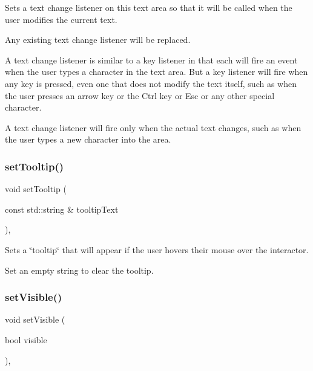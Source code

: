 Sets a text change listener on this text area so that it will be called when the user modifies the current text. 

Any existing text change listener will be replaced.

A text change listener is similar to a key listener in that each will fire an event when the user types a character in the text area. But a key listener will fire when any key is pressed, even one that does not modify the text itself, such as when the user presses an arrow key or the Ctrl key or Esc or any other special character.

A text change listener will fire only when the actual text changes, such as when the user types a new character into the area. \mbox{\label{classGInteractor_a039e0e49beaecc275efce02d416acea8}} 
\subsubsection{\texorpdfstring{set\+Tooltip()}{setTooltip()}}
{\footnotesize\ttfamily void set\+Tooltip (\begin{DoxyParamCaption}\item[{const std\+::string \&}]{tooltip\+Text }\end{DoxyParamCaption})\hspace{0.3cm}{\ttfamily [virtual]}, {\ttfamily [inherited]}}



Sets a \char`\"{}tooltip\char`\"{} that will appear if the user hovers their mouse over the interactor. 

Set an empty string to clear the tooltip. \mbox{\label{classGInteractor_a18e44e30b31525a243960ca3928125aa}} 
\subsubsection{\texorpdfstring{set\+Visible()}{setVisible()}}
{\footnotesize\ttfamily void set\+Visible (\begin{DoxyParamCaption}\item[{bool}]{visible }\end{DoxyParamCaption})\hspace{0.3cm}{\ttfamily [virtual]}, {\ttfamily [inherited]}}




